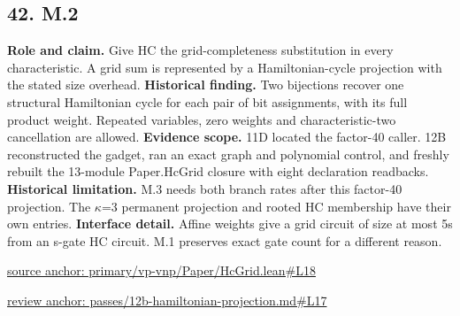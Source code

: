 \documentclass[11pt,letterpaper]{article}
\theoremstyle{definition}\newtheorem{definition}[theorem]{Definition}\newtheorem{example}[theorem]{Example}
\theoremstyle{remark}\newtheorem{remark}[theorem]{Remark}
\begin{document}
\subsection*{42. M.2}
\textbf{Role and claim.} Give HC the grid-completeness substitution in every characteristic. A grid sum is represented by a Hamiltonian-cycle projection with the stated size overhead.
\textbf{Historical finding.} Two bijections recover one structural Hamiltonian cycle for each pair of bit assignments, with its full product weight. Repeated variables, zero weights and characteristic-two cancellation are allowed.
\textbf{Evidence scope.} 11D located the factor-40 caller. 12B reconstructed the gadget, ran an exact graph and polynomial control, and freshly rebuilt the 13-module Paper.HcGrid closure with eight declaration readbacks.
\textbf{Historical limitation.} M.3 needs both branch rates after this factor-40 projection. The \ensuremath{\kappa}=3 permanent projection and rooted HC membership have their own entries.
\textbf{Interface detail.} Affine weights give a grid circuit of size at most 5s from an s-gate HC circuit. M.1 preserves exact gate count for a different reason.
\par\href{https://github.com/nousentllc/VP-VNP-Review/blob/8a7976933b6b2b4ffda1ad3a0dfb5fc6b6f023e8/primary/vp-vnp/Paper/HcGrid.lean\#L18}{source anchor: primary/vp-vnp/Paper/HcGrid.lean\#L18}
\par\href{https://github.com/nousentllc/VP-VNP-Review/blob/8a7976933b6b2b4ffda1ad3a0dfb5fc6b6f023e8/passes/12b-hamiltonian-projection.md\#L17}{review anchor: passes/12b-hamiltonian-projection.md\#L17}
\goodbreak
{}
\hypertarget{claim.43}{}
\end{document}
